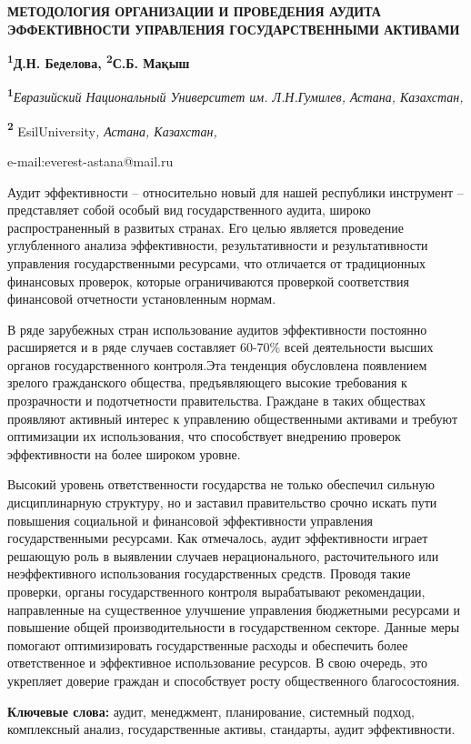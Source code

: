 {\bfseries МЕТОДОЛОГИЯ ОРГАНИЗАЦИИ И ПРОВЕДЕНИЯ АУДИТА ЭФФЕКТИВНОСТИ
УПРАВЛЕНИЯ ГОСУДАРСТВЕННЫМИ АКТИВАМИ}

{\bfseries \textsuperscript{1}Д.Н. Беделова\textsuperscript{\envelope },
\textsuperscript{2}С.Б. Мақыш}

{\bfseries \textsuperscript{1}}\emph{Евразийский Национальный Университет
им. Л.Н.Гумилев, Астана, Казахстан,}

{\bfseries \textsuperscript{2}} EsilUniversity\emph{, Астана, Казахстан,}

e-mail:everest-astana@mail.ru

Аудит эффективности -- относительно новый для нашей республики
инструмент -- представляет собой особый вид государственного аудита,
широко распространенный в развитых странах. Его целью является
проведение углубленного анализа эффективности, результативности и
результативности управления государственными ресурсами, что отличается
от традиционных финансовых проверок, которые ограничиваются проверкой
соответствия финансовой отчетности установленным нормам.

В ряде зарубежных стран использование аудитов эффективности постоянно
расширяется и в ряде случаев составляет 60-70\% всей деятельности высших
органов государственного контроля.Эта тенденция обусловлена появлением
зрелого гражданского общества, предъявляющего высокие требования к
прозрачности и подотчетности правительства. Граждане в таких обществах
проявляют активный интерес к управлению общественными активами и требуют
оптимизации их использования, что способствует внедрению проверок
эффективности на более широком уровне.

Высокий уровень ответственности государства не только обеспечил сильную
дисциплинарную структуру, но и заставил правительство срочно искать пути
повышения социальной и финансовой эффективности управления
государственными ресурсами. Как отмечалось, аудит эффективности играет
решающую роль в выявлении случаев нерационального, расточительного или
неэффективного использования государственных средств. Проводя такие
проверки, органы государственного контроля вырабатывают рекомендации,
направленные на существенное улучшение управления бюджетными ресурсами и
повышение общей производительности в государственном секторе. Данные
меры помогают оптимизировать государственные расходы и обеспечить более
ответственное и эффективное использование ресурсов. В свою очередь, это
укрепляет доверие граждан и способствует росту общественного
благосостояния.

{\bfseries Ключевые слова:} аудит, менеджмент, планирование, системный
подход, комплексный анализ, государственные активы, стандарты, аудит
эффективности.

